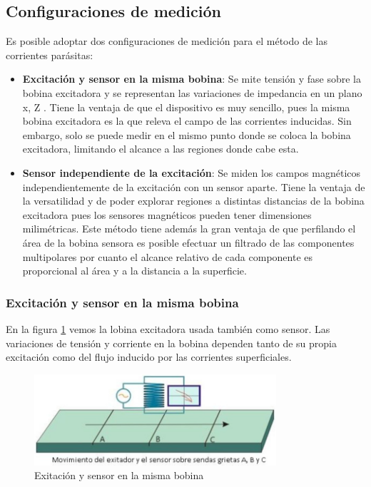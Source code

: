 \subsection{Configuraciones de medición}

Es posible adoptar dos configuraciones de medición para el método de las corrientes parásitas:

\begin{itemize}
	\item \textbf{Excitación y sensor en la misma bobina}: Se mite tensión y fase sobre la bobina excitadora y se representan las variaciones de impedancia en un plano x, Z . Tiene la ventaja de que el dispositivo es muy sencillo, pues la misma bobina excitadora es la que releva el campo de las corrientes inducidas. Sin embargo, solo se puede medir en el mismo punto donde se coloca la bobina excitadora, limitando el alcance a las regiones donde cabe esta.
	
	\item \textbf{Sensor independiente de la excitación}: Se miden los campos magnéticos independientemente de la excitación con un sensor aparte. Tiene la ventaja de la versatilidad y de poder explorar regiones a distintas distancias de la bobina excitadora pues los sensores magnéticos pueden tener dimensiones milimétricas. Este método tiene además la gran ventaja de que perfilando el área de la bobina sensora es posible efectuar un filtrado de las componentes multipolares por cuanto el alcance relativo de cada componente es proporcional al área y a la distancia a la superficie.
\end{itemize}

\subsubsection{Excitación y sensor en la misma bobina}

En la figura \ref{fig:58a} vemos la lobina excitadora usada también como sensor. Las variaciones de tensión y corriente en la bobina dependen tanto de su propia excitación como del flujo inducido por las corrientes superficiales. 

\begin{figure}[H]
    \centering
    \includegraphics[width=0.8\textwidth]{./Figures/fig58a}
	\caption{Exitación y sensor en la misma bobina}
	\label{fig:58a}
\end{figure}

